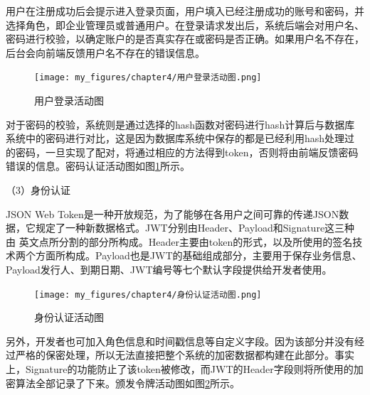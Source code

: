 用户在注册成功后会提示进入登录页面，用户填入已经注册成功的账号和密码，并选择角色，即企业管理员或普通用户。在登录请求发出后，系统后端会对用户名、
密码进行校验，以确定账户的是否真实存在或密码是否正确。如果用户名不存在，后台会向前端反馈用户名不存在的错误信息。

\begin{figure}[h]
    \centering
    \texttt{[image: my\_figures/chapter4/用户登录活动图.png]}
    \caption{用户登录活动图}
    \label{fig:用户登录活动图}
\end{figure}

对于密码的校验，系统则是通过选择的hash函数对密码进行hash计算后与数据库系统中的密码进行对比，这是因为数据库系统中保存的都是已经利用hash处理过
的密码，一旦实现了配对，将通过相应的方法得到token，否则将由前端反馈密码错误的信息。密码认证活动图如图\ref{fig:用户登录活动图}所示。


（3）身份认证

JSON Web Token是一种开放规范，为了能够在各用户之间可靠的传递JSON数据，它规定了一种新数据格式。JWT分别由Header、Payload和Signature这三种由
英文点所分割的部分所构成。Header主要由token的形式，以及所使用的签名技术两个方面所构成。Payload也是JWT的基础组成部分，主要用于保存业务信息、
Payload发行人、到期日期、JWT编号等七个默认字段提供给开发者使用。
\begin{figure}[htb]
    \centering
    \texttt{[image: my\_figures/chapter4/身份认证活动图.png]}
    \caption{身份认证活动图}
    \label{fig:身份认证活动图}
\end{figure}
另外，开发者也可加入角色信息和时间戳信息等自定义字段。因为该部分并没有经过严格的保密处理，所以无法直接把整个系统的加密数据都构建在此部分。事实
上，Signature的功能防止了该token被修改，而JWT的Header字段则将所使用的加密算法全部记录了下来。颁发令牌活动图如图\ref{fig:身份认证活动图}所示。




